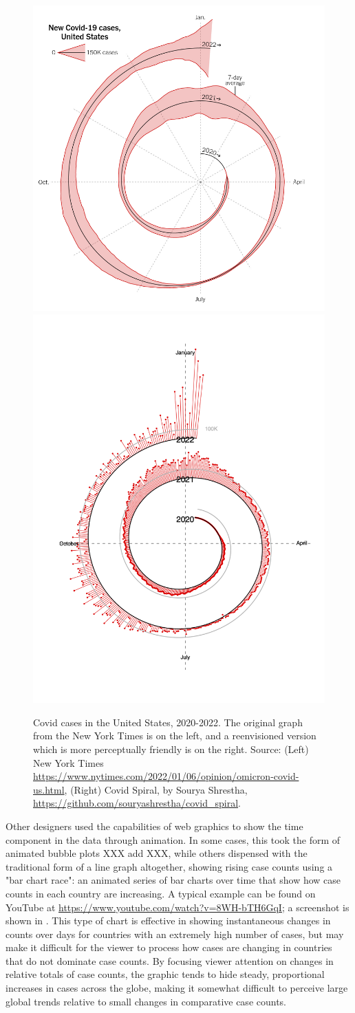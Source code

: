 \documentclass[article]{jdssv}\usepackage[]{graphicx}\usepackage[]{xcolor}
\begin{document}
\begin{figure}\centering
\includegraphics[width=.45\linewidth]{nyt-spiral}\hfill\includegraphics[width=.45\linewidth]{spiral-rework}
\caption{Covid cases in the United States, 2020-2022. The original graph from the New York Times is on the left, and a reenvisioned version which is more perceptually friendly is on the right. Source: (Left) New York Times \url{https://www.nytimes.com/2022/01/06/opinion/omicron-covid-us.html}, (Right) Covid Spiral, by Sourya Shrestha, \url{https://github.com/souryashrestha/covid_spiral}.}
\label{fig:nyt-spiral}
\end{figure}

Other designers used the capabilities of web graphics to show the time component in the data through animation. In some cases, this took the form of animated bubble plots XXX add XXX, while others dispensed with the traditional form of a line graph altogether, showing rising case counts using a "bar chart race": an animated series of bar charts over time that show how case counts in each country are increasing. A typical example can be found on YouTube at \url{https://www.youtube.com/watch?v=8WH-bTH6GqI}; a screenshot is shown in . This type of chart is effective in showing instantaneous changes in counts over days for countries with an extremely high number of cases, but may make it difficult for the viewer to process how cases are changing in countries that do not dominate case counts. By focusing viewer attention on changes in relative totals of case counts, the graphic tends to hide steady, proportional increases in cases across the globe, making it somewhat difficult to perceive large global trends relative to small changes in comparative case counts. 
\end{document}
